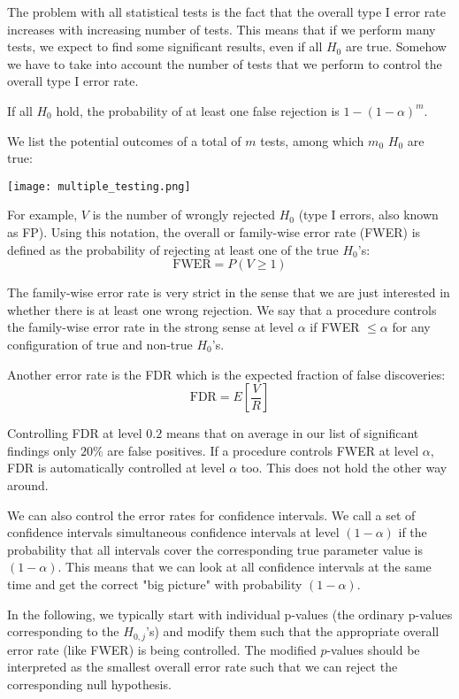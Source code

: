 The problem with all statistical tests is the fact that the overall type I error rate increases with increasing number of tests. This means that if we perform many tests, we expect to find some significant results, even if all $H_0$ are true. Somehow we have to take into account the number of tests that we perform to control the overall type I error rate. \medskip

If all $H_0$ hold, the probability of at least one false rejection is $1- (1- \alpha)^m$. \medskip

We list the potential outcomes of a total of $m$ tests, among which $m_0$ $H_0$ are true:
\begin{center}
	\texttt{[image: multiple\_testing.png]}
\end{center}

For example, $V$ is the number of wrongly rejected $H_0$ (type I errors, also known as FP). Using this notation, the overall or family-wise error rate (FWER) is defined as the probability of rejecting at least one of the true $H_0$'s:
$$\text{FWER} = P(V \geq 1)$$

The family-wise error rate is very strict in the sense that we are just interested in whether there is at least one wrong rejection. We say that a procedure controls the family-wise error rate in the strong sense at level $\alpha$ if FWER $\leq \alpha$ for any configuration of true and non-true $H_0$'s.\medskip

Another error rate is the FDR which is the expected fraction of false discoveries:
$$\text{FDR} = E \left[ \frac{V}{R} \right]$$

Controlling FDR at level $0.2$ means that on average in our list of significant findings only $20\%$ are false positives. If a procedure controls FWER at level $\alpha$, FDR is automatically controlled at level $\alpha$ too. This does not hold the other way around. \medskip

We can also control the error rates for confidence intervals. We call a set of confidence intervals simultaneous confidence intervals at level $(1 - \alpha)$ if the probability that all intervals cover the corresponding true parameter value is $(1 - \alpha)$. This means that we can look at all confidence intervals at the same time and get the correct "big picture" with probability $(1 - \alpha)$. \medskip

In the following, we typically start with individual p-values (the ordinary p-values corresponding to the $H_{0,j}$'s) and modify them such that the appropriate overall error rate (like FWER) is being controlled. The modified $p$-values should be interpreted as the smallest overall error rate such that we can reject the corresponding null hypothesis.\medskip

